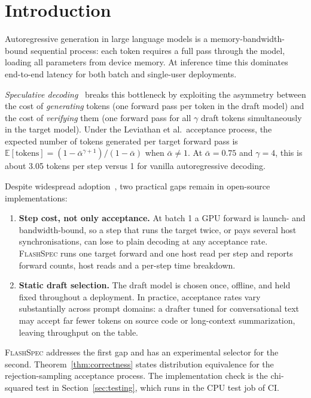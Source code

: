 \documentclass[11pt]{article}
\newcommand{\flashspec}{\textsc{FlashSpec}}
\newcommand{\E}{\mathbb{E}}
\begin{document}
\section{Introduction}
\label{sec:intro}

Autoregressive generation in large language models is a memory-bandwidth-bound
sequential process: each token requires a full pass through the model,
loading all parameters from device memory.
At inference time this dominates end-to-end latency for both batch and
single-user deployments.

\emph{Speculative decoding}~\citep{leviathan2023fast,chen2023accelerating}
breaks this bottleneck by exploiting the asymmetry between the cost of
\emph{generating} tokens (one forward pass per token in the draft model)
and the cost of \emph{verifying} them (one forward pass for all $\gamma$
draft tokens simultaneously in the target model).
Under the Leviathan et al.\ acceptance process, the expected number of tokens
generated per target forward pass is
$\E[\text{tokens}] = (1 - \bar{\alpha}^{\gamma+1}) / (1 - \bar{\alpha})$
when $\bar{\alpha} \neq 1$.
At $\bar{\alpha} = 0.75$ and $\gamma = 4$, this is about 3.05 tokens per step
versus 1 for vanilla autoregressive decoding.

Despite widespread adoption~\citep{cai2024medusa,li2024eagle}, two practical
gaps remain in open-source implementations:

\begin{enumerate}
  \item \textbf{Step cost, not only acceptance.}
  At batch 1 a GPU forward is launch- and bandwidth-bound, so a step that
  runs the target twice, or pays several host synchronisations, can lose
  to plain decoding at any acceptance rate.
  \flashspec{} runs one target forward and one host read per step and
  reports forward counts, host reads and a per-step time breakdown.

  \item \textbf{Static draft selection.}
  The draft model is chosen once, offline, and held fixed throughout a
  deployment.
  In practice, acceptance rates vary substantially across prompt domains:
  a drafter tuned for conversational text may accept far fewer tokens on
  source code or long-context summarization, leaving throughput on the table.
\end{enumerate}

\flashspec{} addresses the first gap and has an experimental selector for
the second.
Theorem~\ref{thm:correctness} states distribution equivalence for the
rejection-sampling acceptance process.
The implementation check is the chi-squared test in
Section~\ref{sec:testing}, which runs in the CPU test job of CI.
\end{document}
